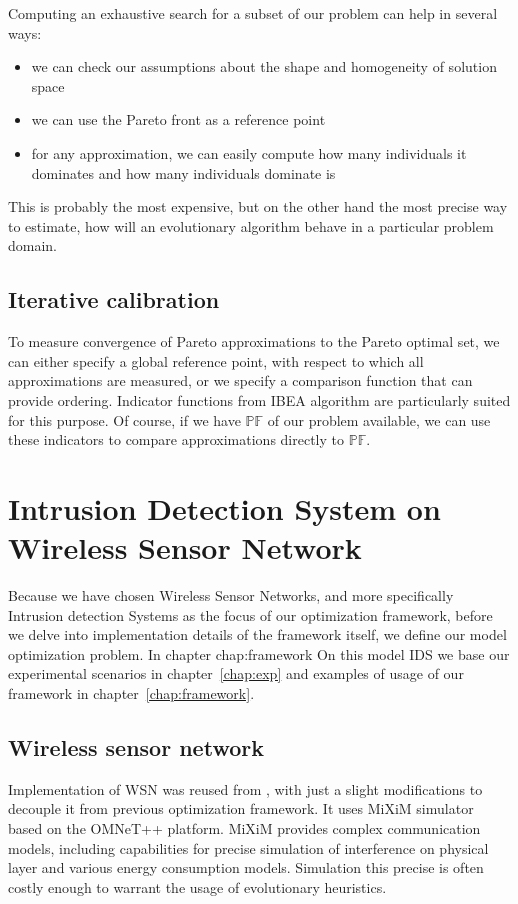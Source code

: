 \documentclass[12pt,oneside]{fithesis2}
\begin{document}
Computing an exhaustive search for a subset of our problem can help in several ways:
\begin{itemize}
  \item we can check our assumptions about the shape and homogeneity of solution space
  \item we can use the Pareto front as a reference point
  \item for any approximation, we can easily compute how many individuals it dominates and how many individuals dominate is
\end{itemize}

This is probably the most expensive, but on the other hand the most precise way to estimate, how will an evolutionary algorithm behave in a particular problem domain.

\section{Iterative calibration}

To measure convergence of Pareto approximations to the Pareto optimal set, we can either specify a global reference point, with respect to which all approximations are measured, or we specify a comparison function that can provide ordering. Indicator functions from IBEA algorithm are particularly suited for this purpose. Of course, if we have $\mathbb{PF}$ of our problem available, we can use these indicators to compare approximations directly to $\mathbb{PF}$.

\chapter{Intrusion Detection System on Wireless Sensor Network}

Because we have chosen Wireless Sensor Networks, and more specifically Intrusion detection Systems as the focus of our optimization framework, before we delve into implementation details of the framework itself, we define our model optimization problem.
In chapter chap:framework On this model IDS we base our experimental scenarios in chapter~\ref{chap:exp} and examples of usage of our framework in chapter~\ref{chap:framework}.

\section{Wireless sensor network}
Implementation of WSN was reused from \cite{Stetsko12}, with just a slight modifications to decouple it from previous optimization framework. It uses MiXiM simulator based on the OMNeT++ platform. MiXiM provides complex communication models, including capabilities for precise simulation of interference on physical layer and various energy consumption models. Simulation this precise is often costly enough to warrant the usage of evolutionary heuristics.
\end{document}
